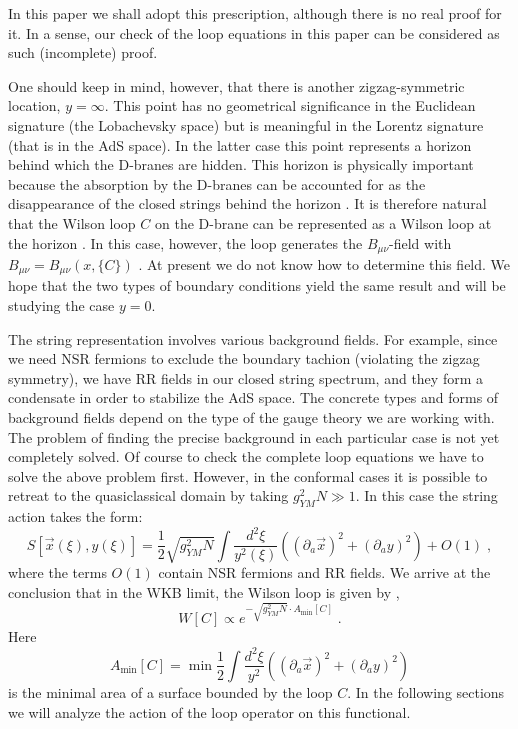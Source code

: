 \documentclass[a4paper,12pt]{article}
\numberwithin{equation}{section}
\begin{document}
In this paper we shall adopt this prescription, although there is no real proof
for it. In a sense, our check of the loop equations in this paper can be considered
as such (incomplete) proof.

One should keep in mind, however, that there is another zigzag-symmetric location,
\( y=\infty  \). This point has no geometrical significance in the Euclidean
signature (the Lobachevsky space) but is meaningful in the Lorentz signature
(that is in the AdS space). In the latter case this point represents a horizon
behind which the D-branes are hidden. This horizon is physically important because
the absorption by the D-branes can be accounted for as the disappearance of
the closed strings behind the horizon \cite{2}. It is therefore natural that
the Wilson loop \( C \) on the D-brane can be represented as a Wilson loop
at the horizon \cite{1}. In this case, however, the loop generates the \( B_{\mu \nu } \)-field
with \( B_{\mu \nu }=B_{\mu \nu }(x,\{C\}) \) \cite{1}. At present we do not
know how to determine this field. We hope that the two types of boundary conditions
yield the same result and will be studying the case \( y=0 \).

The string representation involves various background fields. For example, since
we need NSR fermions to exclude the boundary tachion (violating the zigzag symmetry),
we have RR fields in our closed string spectrum, and they form a condensate
in order to stabilize the AdS space. The concrete types and forms of background
fields depend on the type of the gauge theory we are working with. The problem
of finding the precise background in each particular case is not yet completely
solved. Of course to check the complete loop equations we have to solve the
above problem first. However, in the conformal cases it is possible to retreat
to the quasiclassical domain by taking \( g_{YM}^{2}N\gg 1 \). In this case
the string action takes the form:
\begin{equation}
\label{3.8}
S[\vec{x}(\xi ),y(\xi )]=\frac{1}{2}\sqrt{g_{YM}^{2}N}\int \frac{d^{2}\xi }{y^{2}(\xi )}\left( (\partial _{a}\vec{x})^{2}+(\partial _{a}y)^{2}\right) +O(1)\; ,
\end{equation}
 where the terms \( O(1) \) contain NSR fermions and RR fields. We arrive at
the conclusion that in the WKB limit, the Wilson loop is given by \cite{13},\emph{\,}\cite{14}
\begin{equation}
\label{3.75}
W[C]\varpropto e^{-\sqrt{g_{YM}^{2}N}\cdot A_{\min }[C]}\; .
\end{equation}
 Here
\begin{equation}
\label{3.9}
A_{\min }[C]=\min \frac{1}{2}\int \frac{d^{2}\xi }{y^{2}}\left( (\partial _{a}\vec{x})^{2}+(\partial _{a}y)^{2}\right) 
\end{equation}
 is the minimal area of a surface bounded by the loop \( C \). In the following
sections we will analyze the action of the loop operator on this functional.
\end{document}

